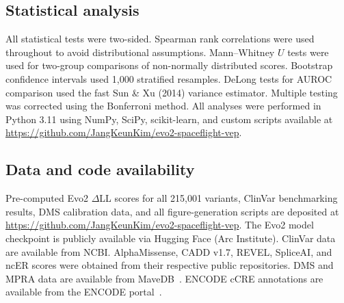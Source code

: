 \subsection{Statistical analysis}
\label{sec:methods_stats}

All statistical tests were two-sided. Spearman rank correlations were used
throughout to avoid distributional assumptions. Mann--Whitney $U$ tests were used
for two-group comparisons of non-normally distributed scores. Bootstrap
confidence intervals used 1,000 stratified resamples. DeLong tests for AUROC
comparison used the fast Sun \& Xu (2014) variance estimator. Multiple testing
was corrected using the Bonferroni method. All analyses were performed in Python
3.11 using NumPy, SciPy, scikit-learn, and custom scripts available at
\url{https://github.com/JangKeunKim/evo2-spaceflight-vep}.

\subsection{Data and code availability}
\label{sec:methods_data}

Pre-computed Evo2 $\Delta$LL scores for all 215,001 variants, ClinVar
benchmarking results, DMS calibration data, and all figure-generation scripts
are deposited at \url{https://github.com/JangKeunKim/evo2-spaceflight-vep}.
The Evo2 model checkpoint is publicly available via Hugging Face
(Arc Institute). ClinVar data are available from NCBI. AlphaMissense, CADD v1.7,
REVEL, SpliceAI, and ncER scores were obtained from their respective public
repositories. DMS and MPRA data are available from
MaveDB~\cite{MaveDB_2019}. ENCODE cCRE annotations are available from
the ENCODE portal~\cite{ENCODE_2020}.
